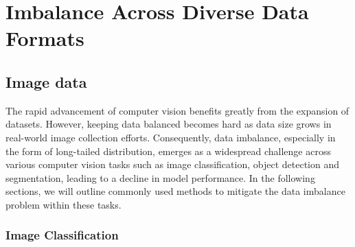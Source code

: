 \section{Imbalance Across Diverse Data Formats}
\label{sec:data}
\subsection{Image data}
\quad The rapid advancement of computer vision benefits greatly from the expansion of datasets. However, keeping data balanced becomes hard as data size grows in real-world image collection efforts. Consequently, data imbalance, especially in the form of long-tailed distribution, emerges as a widespread challenge across various computer vision tasks such as image classification, object detection and segmentation, leading to a decline in model performance. In the following sections, we will outline commonly used methods to mitigate the data imbalance problem within these tasks.

\subsubsection{Image Classification}\ 

